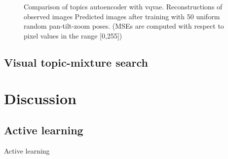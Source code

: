 \begin{figure}
    \begin{center}
    \end{center}
    \caption{ Comparison of topics autoencoder with vqvae.
    \protect{} Reconstructions of observed images
    \protect{} Predicted images after training with 50 uniform random pan-tilt-zoom poses.
    (MSEs are computed with respect to pixel values in the range [0,255])
    }
    \label{fig:vs_vqvae}
\end{figure}

\citep{vqvae2017}


\subsection{Visual topic-mixture search}

\section{Discussion}
\subsection{Active learning}\label{sec:active-learning}
Active learning \citep{Jayaraman2017}


